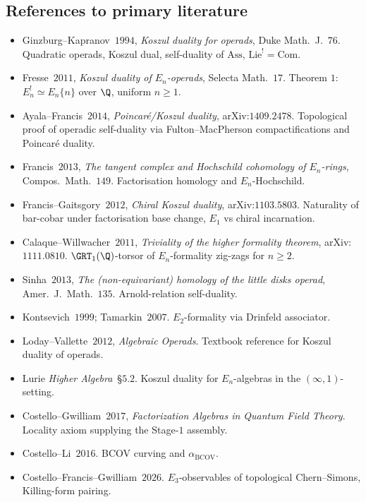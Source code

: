 \subsection*{References to primary literature}

\begin{itemize}
  \item Ginzburg--Kapranov~$1994$, \textit{Koszul duality for operads},
        Duke Math.~J.~$76$. Quadratic operads, Koszul dual, self-duality
        of $\mathrm{Ass}$, $\mathrm{Lie}^! = \mathrm{Com}$.
  \item Fresse~$2011$, \textit{Koszul duality of $E_n$-operads},
        Selecta Math.~$17$. Theorem $1$: $E_n^! \simeq E_n\{n\}$ over
        $\Q$, uniform $n \geq 1$.
  \item Ayala--Francis~$2014$, \emph{Poincar\'e/Koszul duality},
        arXiv:$1409.2478$. Topological proof of operadic self-duality
        via Fulton--MacPherson compactifications and Poincar\'e duality.
  \item Francis~$2013$, \emph{The tangent complex and Hochschild
        cohomology of $E_n$-rings}, Compos.~Math.~$149$. Factorisation
        homology and $E_n$-Hochschild.
  \item Francis--Gaitsgory~$2012$, \emph{Chiral Koszul duality},
        arXiv:$1103.5803$. Naturality of bar-cobar under factorisation
        base change, $E_1$ vs chiral incarnation.
  \item Calaque--Willwacher~$2011$, \emph{Triviality of the higher
        formality theorem}, arXiv:$1111.0810$. $\GRT_1(\Q)$-torsor of
        $E_n$-formality zig-zags for $n \geq 2$.
  \item Sinha~$2013$, \emph{The (non-equivariant) homology of the
        little disks operad}, Amer.~J.~Math.~$135$. Arnold-relation
        self-duality.
  \item Kontsevich~$1999$; Tamarkin~$2007$. $E_2$-formality via
        Drinfeld associator.
  \item Loday--Vallette~$2012$, \emph{Algebraic Operads}. Textbook
        reference for Koszul duality of operads.
  \item Lurie \textit{Higher Algebra}~\S$5.2$. Koszul duality for
        $E_n$-algebras in the $(\infty,1)$-setting.
  \item Costello--Gwilliam~$2017$, \emph{Factorization Algebras in
        Quantum Field Theory}. Locality axiom supplying the Stage-$1$
        assembly.
  \item Costello--Li~$2016$. BCOV curving and $\alpha_{\mathrm{BCOV}}$.
  \item Costello--Francis--Gwilliam~$2026$. $E_3$-observables of
        topological Chern--Simons, Killing-form pairing.
\end{itemize}
